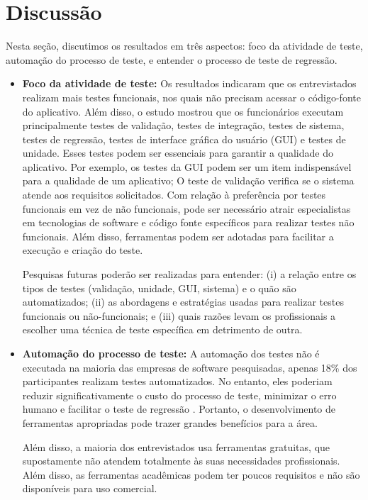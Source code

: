 \section{Discussão}\label{discussions}

Nesta seção, discutimos os resultados em três aspectos: foco da atividade de teste, automação do processo de teste, e entender o processo de teste de regressão.

\begin{itemize}
\item \textbf{Foco da atividade de teste:} Os resultados indicaram que os entrevistados realizam mais testes funcionais, nos quais não precisam acessar o código-fonte do aplicativo. Além disso, o estudo mostrou que os funcionários executam principalmente testes de validação, testes de integração, testes de sistema, testes de regressão, testes de interface gráfica do usuário (GUI) e testes de unidade. Esses testes podem ser essenciais para garantir a qualidade do aplicativo. Por exemplo, os testes da GUI podem ser um item indispensável para a qualidade de um aplicativo; O teste de validação verifica se o sistema atende aos requisitos solicitados. Com relação à preferência por testes funcionais em vez de não funcionais, pode ser necessário atrair especialistas em tecnologias de software e código fonte específicos para realizar testes não funcionais. Além disso, ferramentas podem ser adotadas para facilitar a execução e criação do teste.

Pesquisas futuras poderão ser realizadas para entender: (i) a relação entre os tipos de testes (validação, unidade, GUI, sistema) e o quão são automatizados; (ii) as abordagens e estratégias usadas para realizar testes funcionais ou não-funcionais; e (iii) quais razões levam os profissionais a escolher uma técnica de teste específica em detrimento de outra.
    
\item \textbf{Automação do processo de teste:} A automação dos testes não é executada na maioria das empresas de software pesquisadas, apenas 18\% dos participantes realizam testes automatizados. No entanto, eles poderiam reduzir significativamente o custo do processo de teste, minimizar o erro humano e facilitar o teste de regressão \cite{Ammann:2008:IST:1355340}. Portanto, o desenvolvimento de ferramentas apropriadas pode trazer grandes benefícios para a área.

Além disso, a maioria dos entrevistados usa ferramentas gratuitas, que supostamente não atendem totalmente às suas necessidades profissionais. Além disso, as ferramentas acadêmicas podem ter poucos requisitos e não são disponíveis para uso comercial.


\end{itemize}
